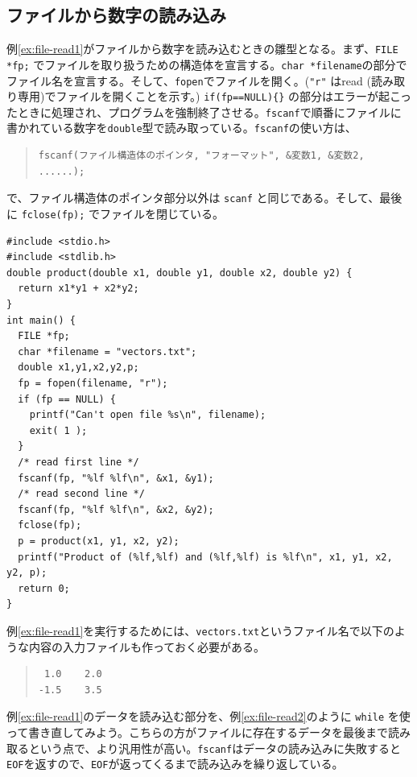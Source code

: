 \subsection{ファイルから数字の読み込み}

例\ref{ex:file-read1}がファイルから数字を読み込むときの雛型となる。まず、\verb|FILE *fp;| でファイルを取り扱うための構造体を宣言する。\verb|char *filename|の部分でファイル名を宣言する。そして、\verb|fopen|でファイルを開く。(\verb|"r"| はread (読み取り専用)でファイルを開くことを示す。) \verb|if(fp==NULL){}| の部分はエラーが起こったときに処理され、プログラムを強制終了させる。\verb|fscanf|で順番にファイルに書かれている数字を\verb|double|型で読み取っている。\verb|fscanf|の使い方は、
\begin{quote}
\begin{verbatim}
fscanf(ファイル構造体のポインタ, "フォーマット", &変数1, &変数2, ......);
\end{verbatim}
\end{quote}
で、ファイル構造体のポインタ部分以外は \verb|scanf| と同じである。そして、最後に \verb|fclose(fp);| でファイルを閉じている。
\begin{reidai}\label{ex:file-read1}
\begin{verbatim}
#include <stdio.h>
#include <stdlib.h>
double product(double x1, double y1, double x2, double y2) {
  return x1*y1 + x2*y2;
}
int main() {
  FILE *fp;
  char *filename = "vectors.txt";
  double x1,y1,x2,y2,p;
  fp = fopen(filename, "r");
  if (fp == NULL) {
    printf("Can't open file %s\n", filename);
    exit( 1 );
  }
  /* read first line */
  fscanf(fp, "%lf %lf\n", &x1, &y1);
  /* read second line */
  fscanf(fp, "%lf %lf\n", &x2, &y2);
  fclose(fp);
  p = product(x1, y1, x2, y2);
  printf("Product of (%lf,%lf) and (%lf,%lf) is %lf\n", x1, y1, x2, y2, p);
  return 0;
}
\end{verbatim}
\end{reidai} \noindent
例\ref{ex:file-read1}を実行するためには、{\tt vectors.txt}というファイル名で以下のような内容の入力ファイルも作っておく必要がある。
\begin{quote}
\begin{verbatim}
 1.0    2.0
-1.5    3.5
\end{verbatim}
\end{quote}
例\ref{ex:file-read1}のデータを読み込む部分を、例\ref{ex:file-read2}のように \verb|while| を使って書き直してみよう。こちらの方がファイルに存在するデータを最後まで読み取るという点で、より汎用性が高い。\verb|fscanf|はデータの読み込みに失敗すると\verb|EOF|を返すので、\verb|EOF|が返ってくるまで読み込みを繰り返している。
